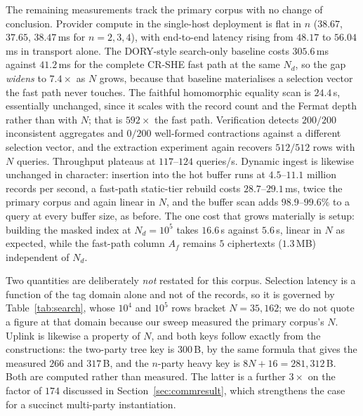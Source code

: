 \documentclass[a4paper,fleqn]{cas-dc}
\begin{document}
The remaining measurements track the primary corpus with no change of
conclusion. Provider compute in the single-host deployment is flat in $n$
($38.67$, $37.65$, $38.47$\,ms for $n=2,3,4$), with end-to-end latency rising
from $48.17$ to $56.04$\,ms in transport alone. The DORY-style search-only
baseline costs $305.6$\,ms against $41.2$\,ms for the complete CR-SHE fast
path at the same $N_d$, so the gap \emph{widens} to $7.4\times$ as $N$ grows,
because that baseline materialises a selection vector the fast path never
touches. The faithful homomorphic equality scan is $24.4$\,s, essentially
unchanged, since it scales with the record count and the Fermat depth rather
than with $N$; that is $592\times$ the fast path. Verification detects
$200/200$ inconsistent aggregates and $0/200$ well-formed contractions against
a different selection vector, and the extraction experiment again recovers
$512/512$ rows with $N$ queries. Throughput plateaus at $117$--$124$
queries/s. Dynamic ingest is likewise unchanged in character: insertion into
the hot buffer runs at $4.5$--$11.1$ million records per second, a fast-path
static-tier rebuild costs $28.7$--$29.1$\,ms, twice the primary corpus and
again linear in $N$, and the buffer scan adds $98.9$--$99.6\%$ to a query at
every buffer size, as before. The one cost that grows materially is setup:
building the masked index at $N_d=10^5$ takes $16.6$\,s against $5.6$\,s,
linear in $N$ as expected, while the fast-path column $A_f$ remains $5$
ciphertexts ($1.3$\,MB) independent of $N_d$.

Two quantities are deliberately \emph{not} restated for this corpus. Selection
latency is a function of the tag domain alone and not of the records, so it is
governed by Table~\ref{tab:search}, whose $10^4$ and $10^5$ rows bracket
$N=35{,}162$; we do not quote a figure at that domain because our sweep
measured the primary corpus's $N$. Uplink is likewise a property of $N$, and
both keys follow exactly from the constructions: the two-party tree key is
$300$\,B, by the same formula that gives the measured $266$ and $317$\,B, and
the $n$-party heavy key is $8N+16=281{,}312$\,B. Both are computed rather than
measured. The latter is a further $3\times$ on the factor of $174$ discussed
in Section~\ref{sec:commresult}, which strengthens the case for a succinct
multi-party instantiation.
\end{document}
